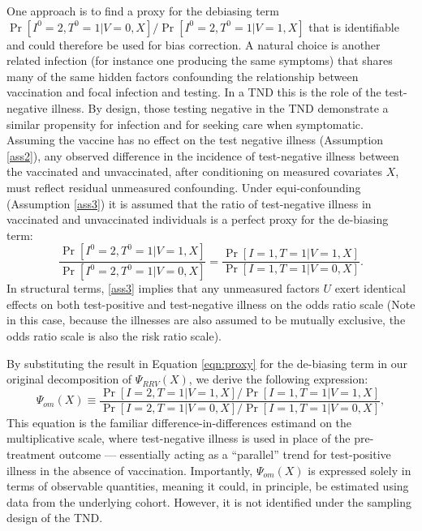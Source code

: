 \documentclass[11pt]{article}
\begin{document}
One approach is to find a proxy for the debiasing term $\Pr[I^0 = 2, T^0 = 1 | V = 0, X]/\Pr[I^0 = 2, T^0 = 1 | V = 1, X]$ that is identifiable and could therefore be used for bias correction. A natural choice is another related infection (for instance one producing the same symptoms) that shares many of the same hidden factors confounding the relationship between vaccination and focal infection and testing. In a TND this is the role of the test-negative illness. By design, those testing negative in the TND demonstrate a similar propensity for infection and for seeking care when symptomatic. Assuming the vaccine has no effect on the test negative illness (Assumption \ref{ass2}), any observed difference in the incidence of test-negative illness between the vaccinated and unvaccinated, after conditioning on measured covariates $X$, must reflect residual unmeasured confounding. Under equi-confounding (Assumption \ref{ass3}) it is assumed that the ratio of test-negative illness in vaccinated and unvaccinated individuals is a perfect proxy for the de-biasing term:
\begin{equation}\label{eqn:proxy}
     \dfrac{\Pr[I^0 = 2, T^0 = 1  | V = 1, X]}{\Pr[I^0 = 2, T^0 = 1 | V = 0, X]} = \frac{\Pr[I = 1, T = 1  | V = 1, X]}{\Pr[I = 1, T = 1  | V = 0, X]}.
\end{equation}
In structural terms, \ref{ass3} implies that any unmeasured factors $U$ exert identical effects on both test-positive and test-negative illness on the odds ratio scale (Note in this case, because the illnesses are also assumed to be mutually exclusive, the odds ratio scale is also the risk ratio scale). 

By substituting the result in Equation \ref{eqn:proxy} for the de-biasing term in our original decomposition of $\Psi_{RRV}(X)$, we derive the following expression:
    \begin{equation}\label{eqn:or_estimand}
         \Psi_{om}(X) \equiv \dfrac{\Pr[I = 2, T = 1 | V = 1, X]/\Pr[I = 1, T = 1 | V = 1, X]}{\Pr[I = 2, T = 1 | V = 0, X]/\Pr[I = 1, T = 1 | V = 0, X]},
    \end{equation}
This equation is the familiar difference-in-differences estimand on the multiplicative scale, where test-negative illness is used in place of the pre-treatment outcome --- essentially acting as a ``parallel'' trend for test-positive illness in the absence of vaccination. Importantly, $\Psi_{om}(X)$ is expressed solely in terms of observable quantities, meaning it could, in principle, be estimated using data from the underlying cohort. However, it is not identified under the sampling design of the TND. 
\end{document}

